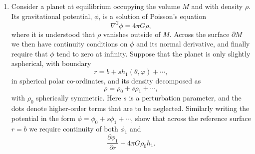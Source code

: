 
\begin{enumerate}
\item Consider a planet at equilibrium occupying the volume $M$ and with density $\rho$. Its gravitational potential, $\phi$, is a solution of Poisson's equation
\begin{equation*}
    \nabla^{2}\phi=4\pi G\rho,
\end{equation*}
where it is understood that $\rho$ vanishes outside of $M$. Across the surface $\partial M$ we then have continuity conditions on $\phi$ and its normal derivative, and finally require that $\phi$ tend to zero at infinity. Suppose that the planet is only slightly aspherical, with boundary
\begin{equation*}
    r=b+sh_{1}(\theta,\varphi)+\cdots,
\end{equation*}
in spherical polar co-ordinates, and its density decomposed as
\begin{equation*}
    \rho=\rho_{0}+s\rho_{1}+\cdots,
\end{equation*}
with $\rho_{0}$ spherically symmetric. Here $s$ is a perturbation parameter, and the dots denote higher-order terms that are to be neglected. Similarly writing the potential in the form $\phi=\phi_{0}+s\phi_{1}+\cdots$, show that across the reference surface $r=b$ we require continuity of both $\phi_{1}$ and
\begin{equation*}
    \frac{\partial\phi_{1}}{\partial r}+4\pi G\rho_{0}h_{1}.
\end{equation*}

\end{enumerate}

